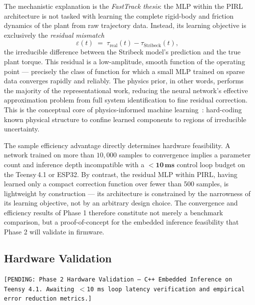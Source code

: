 \documentclass[11pt, a4paper]{article}
\begin{document}
The mechanistic explanation is the \emph{FastTrack thesis}: the MLP within
the PIRL architecture is not tasked with learning the complete rigid-body
and friction dynamics of the plant from raw trajectory data. Instead, its
learning objective is exclusively the \emph{residual mismatch}
\begin{equation}
    \varepsilon(t) \;=\; \tau_{\mathrm{real}}(t) - \tau_{\mathrm{Stribeck}}(t),
    \label{eq:residual}
\end{equation}
the irreducible difference between the Stribeck model's prediction and the
true plant torque. This residual is a low-amplitude, smooth function of the
operating point --- precisely the class of function for which a small MLP
trained on sparse data converges rapidly and reliably. The physics prior,
in other words, performs the majority of the representational work, reducing
the neural network's effective approximation problem from full system
identification to fine residual correction. This is the conceptual core of
physics-informed machine learning~\citep{2019JCoPh.378..686R}: hard-coding
known physical structure to confine learned components to regions of
irreducible uncertainty.

The sample efficiency advantage directly determines hardware feasibility. A
network trained on more than $10{,}000$ samples to convergence implies a
parameter count and inference depth incompatible with a
$\mathbf{<10\,\textbf{ms}}$ control loop budget on the Teensy\,4.1 or
ESP32. By contrast, the residual MLP within PIRL, having learned only a
compact correction function over fewer than 500 samples, is lightweight by
construction --- its architecture is constrained by the narrowness of its
learning objective, not by an arbitrary design choice. The convergence and
efficiency results of Phase 1 therefore constitute not merely a benchmark
comparison, but a proof-of-concept for the embedded inference feasibility
that Phase 2 will validate in firmware.

\subsection{Hardware Validation}
\label{sec:hardware}

\texttt{[PENDING: Phase 2 Hardware Validation --- C++ Embedded Inference
on Teensy 4.1. Awaiting $<$10\,ms loop latency verification and empirical
error reduction metrics.]}



\end{document}
